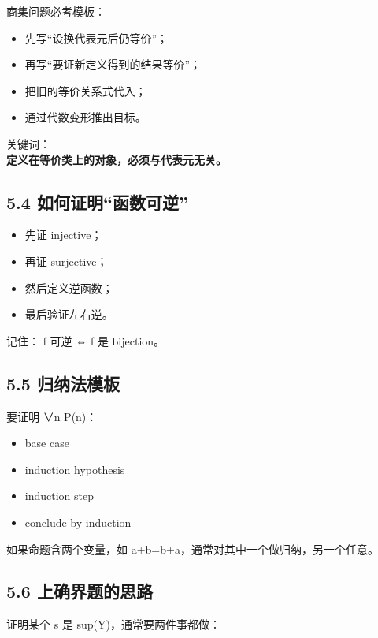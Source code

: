 \documentclass[
  11pt,
]{article}
\providecommand{\tightlist}{%
  \setlength{\itemsep}{0pt}\setlength{\parskip}{0pt}}
\begin{document}
商集问题必考模板：

\begin{itemize}
\tightlist
\item
  先写``设换代表元后仍等价''；
\item
  再写``要证新定义得到的结果等价''；
\item
  把旧的等价关系式代入；
\item
  通过代数变形推出目标。
\end{itemize}

关键词：\\
\textbf{定义在等价类上的对象，必须与代表元无关。}

\subsection{5.4
如何证明``函数可逆''}\label{ux5982ux4f55ux8bc1ux660eux51fdux6570ux53efux9006}

\begin{itemize}
\tightlist
\item
  先证 injective；
\item
  再证 surjective；
\item
  然后定义逆函数；
\item
  最后验证左右逆。
\end{itemize}

记住： f 可逆 ⇔ f 是 bijection。

\subsection{5.5 归纳法模板}\label{ux5f52ux7eb3ux6cd5ux6a21ux677f}

要证明 ∀n P(n)：

\begin{itemize}
\tightlist
\item
  base case
\item
  induction hypothesis
\item
  induction step
\item
  conclude by induction
\end{itemize}

如果命题含两个变量，如 a+b=b+a，通常对其中一个做归纳，另一个任意。

\subsection{5.6
上确界题的思路}\label{ux4e0aux786eux754cux9898ux7684ux601dux8def}

证明某个 s 是 sup(Y)，通常要两件事都做：
\end{document}
